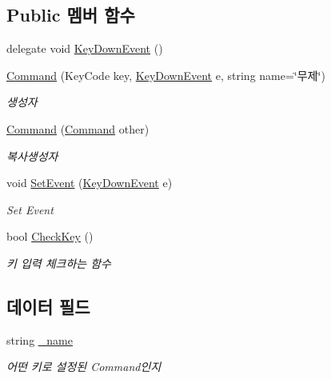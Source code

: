 \subsection*{Public 멤버 함수}
\begin{DoxyCompactItemize}
\item 
delegate void \mbox{\hyperlink{class_command_acc714b5e0de57b7f24b2619fff860b9d}{Key\+Down\+Event}} ()
\item 
\mbox{\hyperlink{class_command_a0c5e5c63b6f555eb858aabe5b0f695f4}{Command}} (Key\+Code key, \mbox{\hyperlink{class_command_acc714b5e0de57b7f24b2619fff860b9d}{Key\+Down\+Event}} e, string name=\char`\"{}무제\char`\"{})
\begin{DoxyCompactList}\small\item\em 생성자 \end{DoxyCompactList}\item 
\mbox{\hyperlink{class_command_a71194ef9a48838bbb99793535f64eb7b}{Command}} (\mbox{\hyperlink{class_command}{Command}} other)
\begin{DoxyCompactList}\small\item\em 복사생성자 \end{DoxyCompactList}\item 
void \mbox{\hyperlink{class_command_a306ef92268d70413bf59adaa36a35b07}{Set\+Event}} (\mbox{\hyperlink{class_command_acc714b5e0de57b7f24b2619fff860b9d}{Key\+Down\+Event}} e)
\begin{DoxyCompactList}\small\item\em Set Event \end{DoxyCompactList}\item 
bool \mbox{\hyperlink{class_command_a1f9dcd759b1d51871f8a6efd30c3a721}{Check\+Key}} ()
\begin{DoxyCompactList}\small\item\em 키 입력 체크하는 함수 \end{DoxyCompactList}\end{DoxyCompactItemize}
\subsection*{데이터 필드}
\begin{DoxyCompactItemize}
\item 
string \mbox{\hyperlink{class_command_a18a8a95d7f2c65bfa786fb525c42d0c4}{\+\_\+name}}
\begin{DoxyCompactList}\small\item\em 어떤 키로 설정된 Command인지 \end{DoxyCompactList}\end{DoxyCompactItemize}
